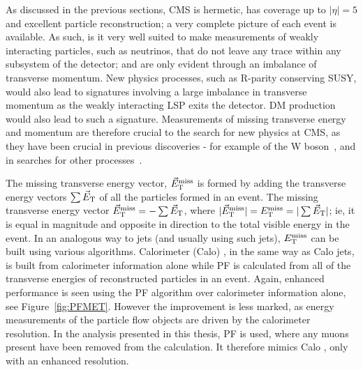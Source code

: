 As discussed in the previous sections, \ac{CMS} is hermetic, has coverage up to $|\eta| = 5$ and excellent particle reconstruction; a very complete picture of each event is available. 
As such, is it very well suited to make measurements of weakly interacting particles, such as neutrinos, that do not leave any trace within any subsystem of the detector; and are only evident through an imbalance of transverse momentum.
New physics processes, such as R-parity conserving \ac{SUSY}, would also lead to signatures involving a large imbalance in transverse momentum as the weakly interacting \ac{LSP} exits the detector. \ac{DM} production would also lead to such a signature.
Measurements of missing transverse energy and momentum are therefore crucial to the search for new physics at \ac{CMS}, as they have been crucial in previous discoveries - for example of the W boson~\cite{bib:Wdiscovery}, and in searches for other processes~\cite{Albajar:173124,Albajar:173125}. 

The missing transverse energy vector, $\vec{E}_{\text{T}}^{\text{miss}}$ is formed by adding the transverse energy vectors $\sum \vec{E}_{\text{T}}$ of all the particles formed in an event. The missing transverse energy vector $\vec{E}_{\text{T}}^{\text{miss}} = - \sum \vec{E}_{\text{T}}$, where $|\vec{E}_{\text{T}}^{\text{miss}}| = E_{\text{T}}^{\text{miss}} = |\sum \vec{E}_{\text{T}}|$; ie, it is equal in magnitude and opposite in direction to the total visible energy in the event.
In an analogous way to jets (and usually using such jets), $E_{\text{T}}^{\text{miss}}$ can be built using various algorithms. 
Calorimeter (Calo) \MET, in the same way as Calo jets, is built from calorimeter information alone while
\ac{PF} \MET is calculated from all of the transverse energies of reconstructed particles in an event. 
Again, enhanced performance is seen using the \ac{PF} algorithm over calorimeter information alone, see Figure~\ref{fig:PFMET}. 
However the improvement is less marked, as energy measurements of the particle flow objects are driven by the calorimeter resolution.
In the analysis presented in this thesis, \ac{PF} \MET is used, where any muons present have been removed from the  calculation. It therefore mimics Calo \MET, only with an enhanced resolution. 

